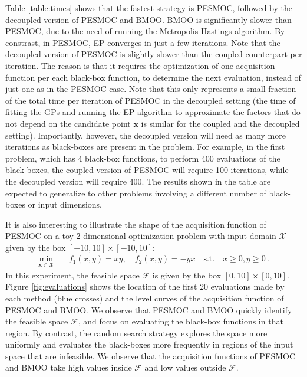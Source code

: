 Table \ref{table:times} shows that the fastest strategy is PESMOC, followed by the decoupled version of PESMOC and BMOO. BMOO is significantly slower
than PESMOC, due to the need of running the Metropolis-Hastings algorithm.  By constrast, in PESMOC, EP converges in just a few iterations. Note that
the decoupled version of PESMOC is slightly slower than the coupled counterpart per iteration.  The reason is that it requires the optimization of one acquisition
function per each black-box function, to determine the next evaluation, instead of just one as in the PESMOC case. Note that this only represents a
small fraction of the total time per iteration of PESMOC in the decoupled setting (the time of fitting the GPs and running the EP algorithm to approximate the
factors that do not depend on the candidate point $\mathbf{x}$ is similar for the coupled and the decoupled setting). Importantly, however,
the decoupled version will need as many more iterations as black-boxes are present in the problem. For example, in the first problem, which has 4 black-box functions,
to perform 400 evaluations of the black-boxes, the coupled version of PESMOC will require 100 iterations, while the decoupled version will require 400. The results
shown in the table are expected to generalize to other problems involving a different number of black-boxes or input dimensions.

It is also interesting to illustrate the shape of the acquisition function of PESMOC on a toy 2-dimensional optimization
problem with input domain $\mathcal{X}$ given by the box $[-10,10]\times[-10,10]$:
\begin{align}
\underset{\mathbf{x} \in \mathcal{X}}{\text{min}} & \quad f_1(x,y) = xy, 
\quad f_2(x,y) = -yx \nonumber \quad \text{s.t.} \quad x \geq 0, y \geq 0\,.
\end{align}
In this experiment, the feasible space $\mathcal{F}$ is given by the box $[0,10]\times[0,10]$.
Figure \ref{fig:evaluations} shows the location of the first 20 evaluations made
by each method (blue crosses) and the level curves of the acquisition function of PESMOC and BMOO.
We observe that PESMOC and BMOO quickly identify the feasible space $\mathcal{F}$, and focus on
evaluating the black-box functions in that region. By contrast, the random search strategy explores the space
more uniformly and evaluates the black-boxes more frequently in regions of the input space that are infeasible.
We observe that the acquisition functions of PESMOC and BMOO take high values inside
$\mathcal{F}$ and low values outside $\mathcal{F}$.

